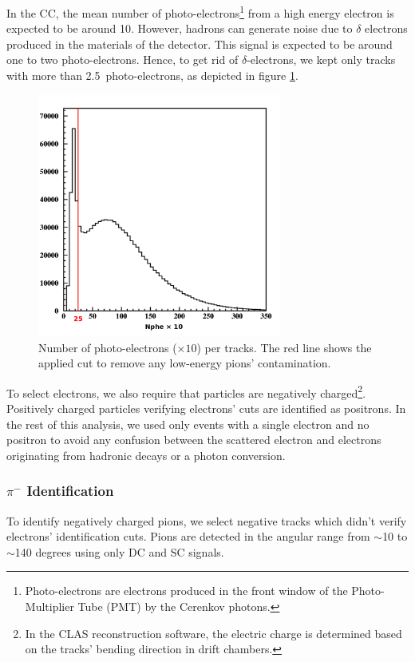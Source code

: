 In the CC, the mean number of photo-electrons\footnote{Photo-electrons are 
electrons produced in the front window of the Photo-Multiplier Tube (PMT) by the Cerenkov photons.} from a high energy electron is expected to be around 10.
However, hadrons can generate noise due to $\delta$ electrons produced in 
the materials of the detector. This signal is expected to be around 
one to two photo-electrons. Hence, to get rid of $\delta$-electrons, we kept only tracks with more than 2.5~photo-electrons, as depicted in figure \ref{delta}. 

\begin{figure}[tbp]
\centering
\includegraphics[width=8cm] {chap5-fig/fig04.png} 
\caption {Number of photo-electrons ($\times 10$) per tracks. The red line 
shows the applied cut to remove any low-energy pions' contamination.}
\label{delta}
\end{figure}

To select electrons, we also require that particles are negatively charged\footnote{In the CLAS reconstruction software, the electric charge is determined based on the tracks' bending direction in drift chambers.}.
Positively charged particles verifying electrons' cuts are identified as 
positrons. In the rest of this analysis, we used only events with a single electron and no positron to avoid any confusion between the scattered electron and electrons originating from hadronic decays or a photon conversion.

\subsubsection{$\pi^-$ Identification}
\label{PiId}

To identify negatively charged pions, we select negative tracks which didn't verify electrons' identification cuts. Pions are detected in the angular range from $\sim$10 to $\sim$140 degrees using only DC and SC signals.

